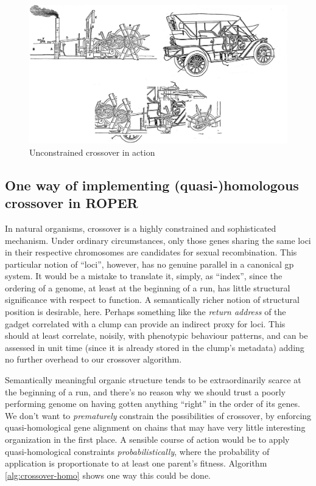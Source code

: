 \documentclass[12pt,glossary]{dalthesis}
\begin{document}
\begin{figure}[htbp]
\centering
\includegraphics[width=.9\linewidth]{../images/carboat-montage.png}
\caption{\label{fig:orga25b504}
Unconstrained crossover in action}
\end{figure}

\subsection{One way of implementing (quasi-)homologous crossover in ROPER}
\label{sec:org843aa5c}
In natural organisms, crossover is a highly constrained and sophisticated mechanism. 
Under ordinary circumstances, only those genes sharing the same loci in their respective
chromosomes are candidates for sexual recombination. This particular notion of ``loci'', 
however, has no genuine parallel in a canonical \gls{gp} system. It would be a mistake to
translate it, simply, as ``index'', since the ordering of a genome, at least at the beginning
of a run, has little structural significance with respect to function. A semantically richer
notion of structural position is desirable, here. Perhaps something like the \emph{return address}
of the gadget correlated with a clump can provide an indirect proxy for loci. This should at
least correlate, noisily, with phenotypic behaviour patterns, and can be
assessed in unit time (since it is already stored in the clump's metadata)
adding no further overhead to our crossover algorithm. 




Semantically meaningful organic structure tends to be extraordinarily scarce at the
beginning of a run, and there's no reason why we should trust a poorly
performing genome on having gotten anything ``right'' in the order of its genes.
We don't want to \emph{prematurely} constrain the possibilities of crossover, by enforcing
quasi-homological gene alignment on chains that may have very little interesting
organization in the first place. A sensible course of action would be to apply quasi-homological
constraints \emph{probabilistically}, where the probability of application is proportionate to
at least one parent's fitness. Algorithm \ref{alg:crossover-homo} shows one way
this could be done. 
\end{document}
